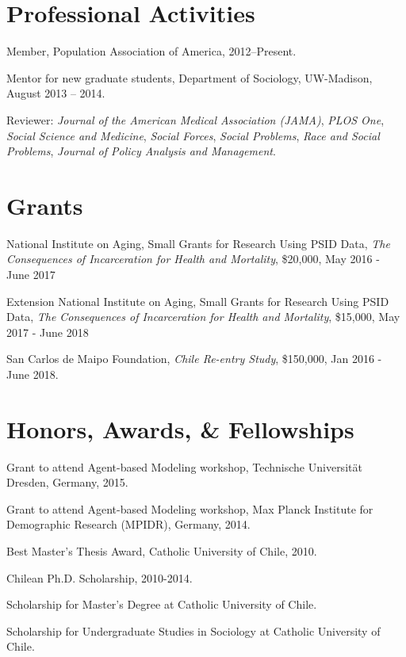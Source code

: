 \documentclass[10pt,letterpaper]{article}
\renewenvironment{itemize}{
  \begin{list}{}{
    \setlength{\leftmargin}{1.5em}
    \setlength{\itemsep}{0.25em}
    \setlength{\parskip}{0pt}
    \setlength{\parsep}{0.25em}
  }
}{
  \end{list}
}
\begin{document}
\section*{Professional Activities}

\begin{itemize}
\item Member, Population Association of America, 2012--Present.
\item Mentor for new graduate students, Department of Sociology, UW-Madison,
August 2013 – 2014.
\item Reviewer: \textit{Journal of the American Medical Association (JAMA)}, \textit{PLOS One}, \textit{Social Science and Medicine}, \textit{Social Forces}, \textit{Social Problems}, \textit{Race and Social Problems}, \textit{Journal of Policy Analysis and Management}.
\end{itemize}

\section*{Grants}

\begin{itemize}
\item National Institute on Aging, Small Grants for Research Using PSID Data, \textit{The Consequences of Incarceration for Health and Mortality},  \$20,000, May 2016 - June 2017
\item Extension National Institute on Aging, Small Grants for Research Using PSID Data, \textit{The Consequences of Incarceration for Health and Mortality},  \$15,000, May 2017 - June 2018
\item San Carlos de Maipo Foundation, \textit{Chile Re-entry Study}, \$150,000, Jan 2016 - June 2018.
\end{itemize}


\section*{Honors, Awards, \& Fellowships}

\begin{itemize}
\item Grant to attend Agent-based Modeling workshop, Technische Universität Dresden, Germany, 2015.
\item Grant to attend Agent-based Modeling workshop, Max Planck Institute for Demographic Research (MPIDR), Germany, 2014.
\item Best Master's Thesis Award, Catholic University of Chile, 2010.
\item Chilean Ph.D. Scholarship, 2010-2014.
\item Scholarship for Master’s Degree at Catholic University of Chile.
\item Scholarship for Undergraduate Studies in Sociology at Catholic University of Chile.
\end{itemize}
\end{document}
